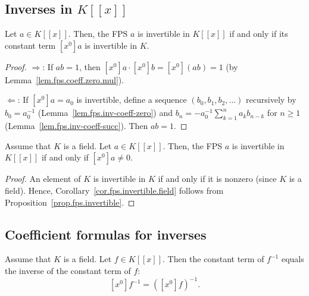 \subsection{Inverses in $K[[x]]$}

\begin{proposition}
\label{prop.fps.invertible}
\leantarget
\leanok
Let $a\in K[[x]]$.
Then, the FPS $a$ is invertible in $K[[x]]$ if
and only if its constant term $[x^{0}]a$ is invertible in $K$.
\end{proposition}

\begin{proof}
\leanok
$\Longrightarrow$: If $ab=1$, then $[x^0]a\cdot[x^0]b = [x^0](ab)=1$
(by Lemma~\ref{lem.fps.coeff.zero.mul}).

$\Longleftarrow$: If $[x^0]a = a_0$ is invertible, define a sequence
$(b_0, b_1, b_2, \ldots)$ recursively by
$b_0 = a_0^{-1}$ (Lemma~\ref{lem.fps.inv-coeff-zero}) and
$b_n = -a_0^{-1}\sum_{k=1}^n a_k b_{n-k}$ for $n \geq 1$
(Lemma~\ref{lem.fps.inv-coeff-succ}).
Then $ab = 1$.
\end{proof}

\begin{corollary}
\label{cor.fps.invertible.field}
\leantarget
\leanok
Assume that $K$ is a field. Let $a\in K[[x]]$.
Then, the FPS $a$ is invertible in $K[[x]]$ if and only if $[x^{0}]a\neq0$.
\end{corollary}

\begin{proof}
\leanok
An element of $K$ is invertible in $K$ if and only if it is nonzero (since $K$
is a field). Hence, Corollary~\ref{cor.fps.invertible.field} follows from
Proposition~\ref{prop.fps.invertible}.
\end{proof}

\subsection{Coefficient formulas for inverses}

\begin{lemma}
\label{lem.fps.inv-coeff-zero}
\leanhelper
\leanok
Assume that $K$ is a field. Let $f\in K[[x]]$. Then the constant term of $f^{-1}$
equals the inverse of the constant term of $f$:
\[
\left[x^{0}\right]f^{-1} = \left(\left[x^{0}\right]f\right)^{-1}.
\]
\end{lemma}

